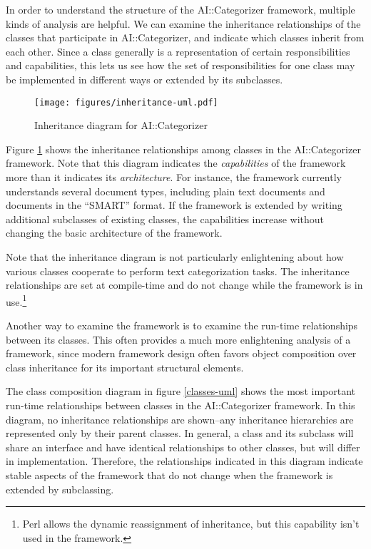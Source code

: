 \documentclass[a4paper]{report}
\begin{document}
In order to understand the structure of the AI::Categorizer framework,
multiple kinds of analysis are helpful.  We can examine the
inheritance relationships of the classes that participate in
AI::Categorizer, and indicate which classes inherit from each other.
Since a class generally is a representation of certain
responsibilities and capabilities, this lets us see how the set of
responsibilities for one class may be implemented in different ways or
extended by its subclasses.

\begin{figure}
\texttt{[image: figures/inheritance-uml.pdf]}
\caption{Inheritance diagram for AI::Categorizer}
\label{inheritance-uml}
\end{figure}

Figure \ref{inheritance-uml} shows the inheritance relationships among
classes in the AI::Categorizer framework.  Note that this diagram
indicates the \emph{capabilities} of the framework more than it
indicates its \emph{architecture}.  For instance, the framework
currently understands several document types, including plain text
documents and documents in the ``SMART'' format.  If the framework is
extended by writing additional subclasses of existing classes, the
capabilities increase without changing the basic architecture of the
framework.

Note that the inheritance diagram is not particularly enlightening
about how various classes cooperate to perform text categorization
tasks.  The inheritance relationships are set at compile-time and do
not change while the framework is in use.\footnote{Perl allows the
dynamic reassignment of inheritance, but this capability isn't used
in the framework.}

Another way to examine the framework is to examine the run-time
relationships between its classes.  This often provides a much more
enlightening analysis of a framework, since modern framework design
often favors object composition over class inheritance for its
important structural elements. \cite[p. 20]{gamma:95}

The class composition diagram in figure \ref{classes-uml} shows the
most important run-time relationships between classes in the
AI::Categorizer framework.  In this diagram, no inheritance
relationships are shown--any inheritance hierarchies are represented
only by their parent classes.  In general, a class and its subclass
will share an interface and have identical relationships to other
classes, but will differ in implementation.  Therefore, the
relationships indicated in this diagram indicate stable aspects of the
framework that do not change when the framework is extended by
subclassing.
\end{document}
